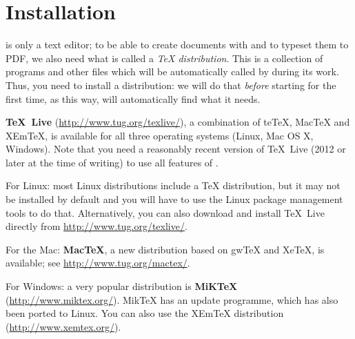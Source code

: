
\chapter{Installation}
\label{chap.installation}

\Tw{} is only a text editor; to be able to create documents with \AllTeX{} and to typeset them to PDF, we also need what is called a \emph{{\TeX} distribution}. This is a collection of programs and other files which will be automatically called by {\Tw} during its work. Thus, you need to install a distribution: we will do that \emph{before} starting {\Tw} for the first time, as this way, {\Tw} will automatically find what it needs.

\textbf{TeX~Live} (\url{http://www.tug.org/texlive/}), a combination of teTeX, MacTeX and XEmTeX, is available for all three operating systems (Linux, Mac OS X, Windows). Note that you need a reasonably recent version of TeX~Live (2012 or later at the time of writing) to use all features of {\Tw}.

\begin{OSLinux}
For Linux: most Linux distributions include a {\TeX} distribution, but it may not be installed by default and you will have to use the Linux package management tools to do that. Alternatively, you can also download and install TeX~Live directly from \url{http://www.tug.org/texlive/}.
\end{OSLinux}

\begin{OSMac}
For the Mac: \textbf{MacTeX}, a new distribution based on gwTeX and XeTeX, is available; see \url{http://www.tug.org/mactex/}.
\end{OSMac}

\begin{OSWindows}
For Windows: a very popular distribution is \textbf{MiKTeX} (\url{http://www.miktex.org/}). MikTeX has an update programme, which has also been ported to Linux. You can also use the XEmTeX distribution (\url{http://www.xemtex.org/}).
\end{OSWindows}

